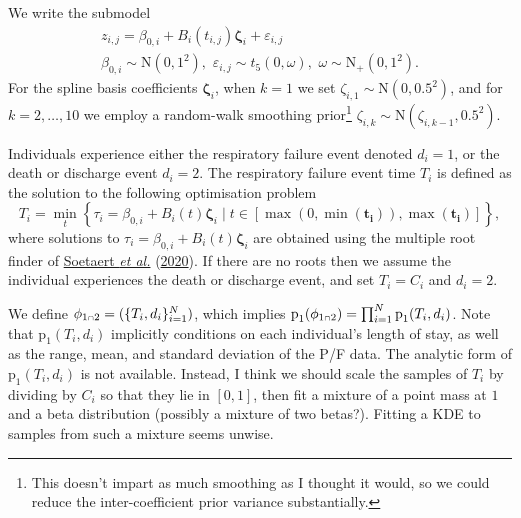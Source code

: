 \documentclass[
  10pt,
  a4paper,
]{article}
\let\Oldcap\cap
\renewcommand{\cap}{\mathrel{\mathsmaller{\Oldcap}}}
\newcommand{\pd}{\text{p}}
\begin{document}
We write the submodel \begin{equation}
\begin{gathered}
  z_{i, j} = \beta_{0, i} + B_{i}(t_{i, j})\boldsymbol{\zeta}_{i} + \varepsilon_{i, j} \\
  \beta_{0, i} \sim \text{N}(0, 1^2), \,\, \varepsilon_{i, j} \sim t_{5}(0, \omega), \,\,  \omega \sim \text{N}_{+}(0, 1^2).
\end{gathered}
\end{equation} For the spline basis coefficients
\(\boldsymbol{\zeta}_{i}\), when \(k = 1\) we set
\(\zeta_{i, 1} \sim \text{N}(0, 0.5^2)\), and for \(k = 2, \ldots, 10\)
we employ a random-walk smoothing prior\footnote{This doesn't impart as
  much smoothing as I thought it would, so we could reduce the
  inter-coefficient prior variance substantially.}
\(\zeta_{i, k} \sim \text{N}(\zeta_{i, k - 1}, 0.5^2)\).

Individuals experience either the respiratory failure event denoted
\(d_{i} = 1\), or the death or discharge event \(d_{i} = 2\). The
respiratory failure event time \(T_{i}\) is defined as the solution to
the following optimisation problem \begin{equation}
  T_{i} = \min_{t} \left\{
    \tau_{i} = \beta_{0, i} + B_{i}(t)\boldsymbol{\zeta}_{i}
    \mid
    t \in [\max(0, \min(\boldsymbol{t_{i}})), \max(\boldsymbol{t_{i}})]
  \right\},
  \label{eqn:event_time_model_def}
\end{equation} where solutions to
\(\tau_{i} = \beta_{0, i} + B_{i}(t)\boldsymbol{\zeta}_{i}\) are
obtained using the multiple root finder of
\protect\hyperlink{ref-soetaert_rootsolve_2020}{Soetaert \emph{et al.}}
(\protect\hyperlink{ref-soetaert_rootsolve_2020}{2020}). If there are no
roots then we assume the individual experiences the death or discharge
event, and set \(T_{i} = C_{i}\) and \(d_{i} = 2\).

We define \(\phi_{1 \cap 2} = (\{T_{i}, d_{i}\}_{i = 1}^{N})\), which
implies
\(\pd_{1}(\phi_{1 \cap 2}) = \prod_{i = 1}^{N}\pd_{1}(T_{i}, d_{i})\).
Note that \(\pd_{1}(T_{i}, d_{i})\) implicitly conditions on each
individual's length of stay, as well as the range, mean, and standard
deviation of the P/F data. The analytic form of
\(\pd_{1}(T_{i}, d_{i})\) is not available. Instead, I think we should
scale the samples of \(T_{i}\) by dividing by \(C_{i}\) so that they lie
in \([0, 1]\), then fit a mixture of a point mass at \(1\) and a beta
distribution (possibly a mixture of two betas?). Fitting a KDE to
samples from such a mixture seems unwise.
\end{document}
